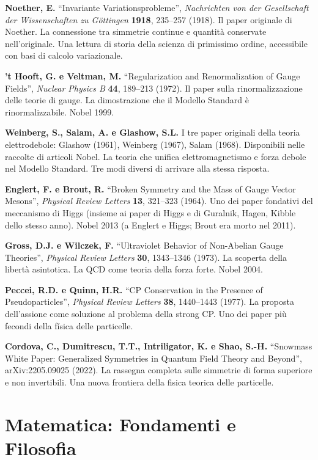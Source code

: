 \documentclass[11.5pt,a4paper,openany]{book}
\theoremstyle{remark}
\begin{document}
\textbf{Noether, E.} ``Invariante Variationsprobleme'', \textit{Nachrichten von der Gesellschaft der Wissenschaften zu Göttingen} \textbf{1918}, 235--257 (1918). Il paper originale di Noether. La connessione tra simmetrie continue e quantità conservate nell'originale. Una lettura di storia della scienza di primissimo ordine, accessibile con basi di calcolo variazionale.

\textbf{'t Hooft, G. e Veltman, M.} ``Regularization and Renormalization of Gauge Fields'', \textit{Nuclear Physics B} \textbf{44}, 189--213 (1972). Il paper sulla rinormalizzazione delle teorie di gauge. La dimostrazione che il Modello Standard è rinormalizzabile. Nobel 1999.

\textbf{Weinberg, S., Salam, A. e Glashow, S.L.} I tre paper originali della teoria elettrodebole: Glashow (1961), Weinberg (1967), Salam (1968). Disponibili nelle raccolte di articoli Nobel. La teoria che unifica elettromagnetismo e forza debole nel Modello Standard. Tre modi diversi di arrivare alla stessa risposta.

\textbf{Englert, F. e Brout, R.} ``Broken Symmetry and the Mass of Gauge Vector Mesons'', \textit{Physical Review Letters} \textbf{13}, 321--323 (1964). Uno dei paper fondativi del meccanismo di Higgs (insieme ai paper di Higgs e di Guralnik, Hagen, Kibble dello stesso anno). Nobel 2013 (a Englert e Higgs; Brout era morto nel 2011).

\textbf{Gross, D.J. e Wilczek, F.} ``Ultraviolet Behavior of Non-Abelian Gauge Theories'', \textit{Physical Review Letters} \textbf{30}, 1343--1346 (1973). La scoperta della libertà asintotica. La QCD come teoria della forza forte. Nobel 2004.

\textbf{Peccei, R.D. e Quinn, H.R.} ``CP Conservation in the Presence of Pseudoparticles'', \textit{Physical Review Letters} \textbf{38}, 1440--1443 (1977). La proposta dell'assione come soluzione al problema della strong CP. Uno dei paper più fecondi della física delle particelle.

\textbf{Cordova, C., Dumitrescu, T.T., Intriligator, K. e Shao, S.-H.} ``Snowmass White Paper: Generalized Symmetries in Quantum Field Theory and Beyond'', arXiv:2205.09025 (2022). La rassegna completa sulle simmetrie di forma superiore e non invertibili. Una nuova frontiera della fisica teorica delle particelle.

\section{Matematica: Fondamenti e Filosofia}
\end{document}
